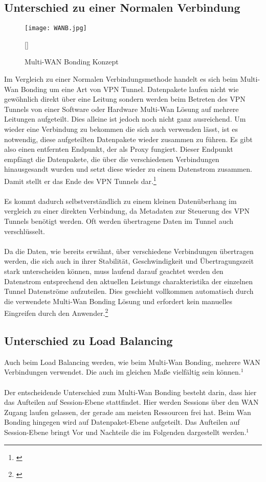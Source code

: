 \newpage
\subsection{Unterschied zu einer Normalen Verbindung}
\begin{figure}[h]
    \centering
    \texttt{[image: WANB.jpg]}
    \caption[Multi-WAN Bonding Konzept]{Multi-WAN Bonding Konzept}[\cite{WANB}]
\end{figure}
\noindent
Im Vergleich zu einer Normalen Verbindungsmethode handelt es sich beim Multi-Wan Bonding um eine Art von VPN Tunnel. Datenpakete laufen nicht wie gewöhnlich direkt über eine Leitung sondern werden beim Betreten des VPN Tunnels von einer Software oder Hardware Multi-Wan Lösung auf mehrere Leitungen aufgeteilt. Dies alleine ist jedoch noch nicht ganz ausreichend. Um wieder eine Verbindung zu bekommen die sich auch verwenden lässt, ist es notwendig, diese aufgeteilten Datenpakete wieder zusammen zu führen. Es gibt also einen entfernten Endpunkt, der als Proxy fungiert. Dieser Endpunkt empfängt die Datenpakete, die über die verschiedenen Verbindungen hinausgesandt wurden und setzt diese wieder zu einem Datenstrom zusammen. Damit stellt er das Ende des VPN Tunnels dar.\footnote[1]{\cite[Vgl.][]{MWAN1}}
\\\\
Es kommt dadurch selbstverständlich zu einem kleinen Datenüberhang im vergleich zu einer direkten Verbindung, da Metadaten zur Steuerung des VPN Tunnels benötigt werden. Oft werden übertragene Daten im Tunnel auch verschlüsselt.
\\\\
Da die Daten, wie bereits erwähnt, über verschiedene Verbindungen übertragen werden, die sich auch in ihrer Stabilität, Geschwindigkeit und Übertragungszeit stark unterscheiden können, muss laufend darauf geachtet werden den Datenstrom entsprechend den aktuellen Leistungs charakteristika der einzelnen Tunnel Datenströme aufzuteilen. Dies geschieht vollkommen automatisch durch die verwendete Multi-Wan Bonding Lösung und erfordert kein manuelles Eingreifen durch den Anwender.\footnote[2]{\cite[Vgl.][]{MWAN}}

\subsection{Unterschied zu Load Balancing}
Auch beim Load Balancing werden, wie beim Multi-Wan Bonding, mehrere WAN Verbindungen verwendet. Die auch im gleichen Maße vielfältig sein können.$^{1}$
\\\\
Der entscheidende Unterschied zum Multi-Wan Bonding besteht darin, dass hier das Aufteilen auf Session-Ebene stattfindet. Hier werden Sessions über den WAN Zugang laufen gelassen, der gerade am meisten Ressourcen frei hat. Beim Wan Bonding hingegen wird auf Datenpaket-Ebene aufgeteilt. Das Aufteilen auf Session-Ebene bringt Vor und Nachteile die im Folgenden dargestellt werden.$^{1}$
\newpage
